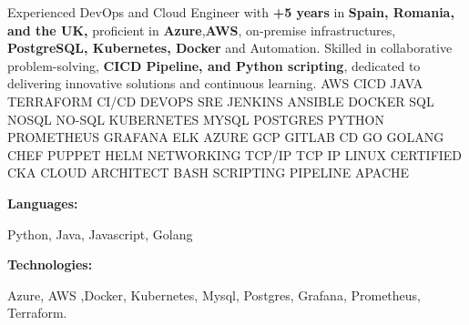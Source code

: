 \documentclass[9pt]{developercv} %
\begin{document}
\begin{minipage}[t]{0.46\textwidth}
    \vspace{-6pt}

    {Experienced DevOps and Cloud Engineer with \textbf{+5 years} in \textbf{Spain,
            Romania, and the UK,} proficient in \textbf{Azure},\textbf{AWS}, on-premise
        infrastructures, \textbf{PostgreSQL, Kubernetes, Docker} and Automation.
        Skilled in collaborative problem-solving, \textbf{CICD
            Pipeline, and Python scripting}, dedicated to delivering
        innovative solutions and continuous learning.}
    {\color{white}\tiny AWS CICD JAVA TERRAFORM CI/CD DEVOPS SRE JENKINS ANSIBLE DOCKER SQL NOSQL NO-SQL KUBERNETES MYSQL POSTGRES PYTHON PROMETHEUS GRAFANA ELK AZURE GCP GITLAB CD GO GOLANG CHEF PUPPET HELM NETWORKING TCP/IP TCP IP LINUX CERTIFIED CKA CLOUD ARCHITECT BASH SCRIPTING PIPELINE APACHE  }
\end{minipage}
\hfill %
\begin{minipage}[t]{0.465\textwidth}
    \vspace{-6pt}

    \begin{minipage}[t]{0.2\textwidth}
        \textbf{Languages:}
    \end{minipage}
    \hfill
    \begin{minipage}[t]{0.72\textwidth}
        Python, Java, Javascript, Golang
    \end{minipage}
    \vspace{4mm}

    \begin{minipage}[t]{0.2\textwidth}
        \textbf{Technologies:}
    \end{minipage}
    \hfill
    \begin{minipage}[t]{0.73\textwidth}
        Azure, AWS ,Docker, Kubernetes, Mysql, Postgres, Grafana, Prometheus, Terraform.
    \end{minipage}

\end{minipage}
\end{document}
